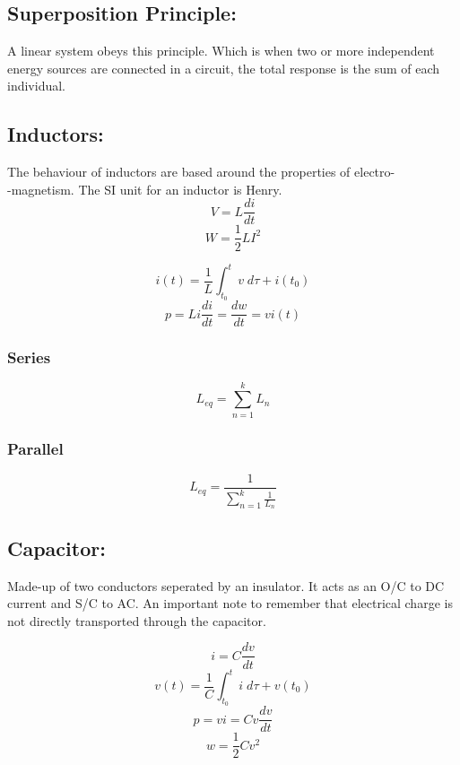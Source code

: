 \documentclass[a5paper]{article}
\begin{document}
	\subsection{Superposition Principle:}
	A linear system obeys this principle. Which is when two or more independent energy sources are connected in a circuit, the total response is the sum of each individual.
	\subsection{Inductors:}
	The behaviour of inductors are based around the properties of electro-\\-magnetism. The SI unit for an inductor is Henry.
	$$V=L\frac{di}{dt}$$
	$$W=\frac{1}{2}LI^{2}$$
	\begin{center}
	\end{center}
	$$i(t)=\frac{1}{L}\int^{t}_{t_{0}}v\;d\tau+i(t_{0})$$
	$$p=Li\frac{di}{dt}=\frac{dw}{dt}=vi(t)$$
	\subsubsection{Series}
	$$L_{eq}=\sum^{k}_{n=1}L_{n}$$
	\subsubsection{Parallel}
	$$L_{eq}=\frac{1}{\sum^{k}_{n=1}\frac{1}{L_{n}}}$$
	\subsection{Capacitor:}
	Made-up of two conductors seperated by an insulator. It acts as an O/C to DC current and S/C to AC. An important note to remember that electrical charge is not directly transported through the capacitor.
	\begin{center}
	\end{center}
	$$i=C\frac{dv}{dt}$$
	$$v(t)=\frac{1}{C}\int^{t}_{t_{0}}i\;d\tau+v(t_{0})$$
	$$p=vi=Cv\frac{dv}{dt}$$
	$$w=\frac{1}{2}Cv^{2}$$
\end{document}
